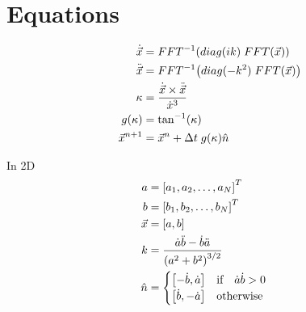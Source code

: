 \documentclass[paper=a4,fontsize=11pt]{scrartcl}
\begin{document}
\section*{Equations}

\begin{align}
\dot{\vec{x}}& = FFT^{-1}\paren{diag(ik) \; FFT(\vec{x})}\\
\ddot{\vec{x}}& = FFT^{-1}\paren{diag(-k^2) \; FFT(\vec{x})}\\
\kappa& = \frac{\dot{\vec{x}} \times \ddot{\vec{x}}}{\dot{x}^3}\\
g(\kappa)& = \tan^{-1}\paren{\kappa}\\
\vec{x}^{n+1}& = \vec{x}^n + \Delta t \; g(\kappa) \hat{n}
\end{align}

In 2D
\begin{align}
a& = \bracket{a_1, a_2, \dotsc, a_N}^T\\
b& = \bracket{b_1, b_2, \dotsc, b_N}^T\\
\vec{x}& = \bracket{a, b}\\
k& = \frac{\dot{a} \ddot{b} - \dot{b} \ddot{a}}{\paren{a^2 + b^2}^{3/2}}\\
\hat{n}& = 
	\begin{cases}
		\bracket{-\dot{b}, \dot{a}} \quad \text{if} \quad \dot{a} \dot{b} > 0\\
		\bracket{\dot{b}, -\dot{a}} \quad \text{otherwise}
	\end{cases}
\end{align}
\end{document}
